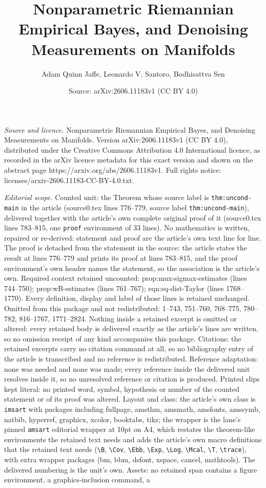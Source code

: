 \documentclass[10pt,a4paper]{amsart}
\title[Nonparametric Riemannian Empirical Bayes, and Denoising Meas]{Nonparametric Riemannian Empirical Bayes, and Denoising Measurements on Manifolds}
\author{Adam Quinn Jaffe, Leonardo V. Santoro, Bodhisattva Sen}
\date{Source: arXiv:2606.11183v1 (CC BY 4.0)}
\begin{document}
\maketitle

\noindent\emph{Source and licence.} Nonparametric Riemannian Empirical Bayes, and Denoising Measurements on Manifolds. Version arXiv:2606.11183v1 (CC BY 4.0), distributed under the Creative Commons Attribution 4.0 International licence, as recorded in the arXiv licence metadata for this exact version and shown on the abstract page https://arxiv.org/abs/2606.11183v1. Full rights notice: licenses/arxiv-2606.11183-CC-BY-4.0.txt.\par\smallskip

\noindent\textit{Editorial scope.} Counted unit: the Theorem whose source label is \texttt{thm:uncond-main} in the article (source0.tex lines 776--779, source label \texttt{thm:uncond-main}), delivered together with the article's own complete original proof of it (source0.tex lines 783--815, one \texttt{proof} environment of 33 lines). No mathematics is written, repaired or re-derived: statement and proof are the article's own text line for line. The proof is detached from the statement in the source: the article states the result at lines 776--779 and prints its proof at lines 783--815, and the proof environment's own header names the statement, so the association is the article's own. Required context retained uncounted: prop:mux-sigmax-estimates (lines 744--750); prop:wB-estimates (lines 761--767); eqn:sq-dist-Taylor (lines 1768--1770). Every definition, display and label of those lines is retained unchanged. Omitted from this package and not redistributed: 1--743, 751--760, 768--775, 780--782, 816--1767, 1771--2824. Nothing inside a retained excerpt is omitted or altered: every retained body is delivered exactly as the article's lines are written, so no omission receipt of any kind accompanies this package. Citations: the retained excerpts carry no citation command at all, so no bibliography entry of the article is transcribed and no reference is redistributed. Reference adaptation: none was needed and none was made; every reference inside the delivered unit resolves inside it, so no unresolved reference or citation is produced. Printed slips kept literal: no printed word, symbol, hypothesis or number of the counted statement or of its proof was altered. Layout and class: the article's own class is \texttt{imsart} with packages including fullpage, amsthm, amsmath, amsfonts, amssymb, natbib, hyperref, graphicx, xcolor, booktabs, tikz; the wrapper is the lane's pinned \texttt{amsart} editorial wrapper at 10pt on A4, which restates the theorem-like environments the retained text needs and adds the article's own macro definitions that the retained text needs (\texttt{\textbackslash B}, \texttt{\textbackslash Cov}, \texttt{\textbackslash Ebb}, \texttt{\textbackslash Exp}, \texttt{\textbackslash Log}, \texttt{\textbackslash Mcal}, \texttt{\textbackslash T}, \texttt{\textbackslash trace}), with extra wrapper packages (bm, bbm, dsfont, xspace, cancel, mathtools). The delivered numbering is the unit's own. Assets: no retained span contains a figure environment, a graphics-inclusion command, a 
\end{document}
